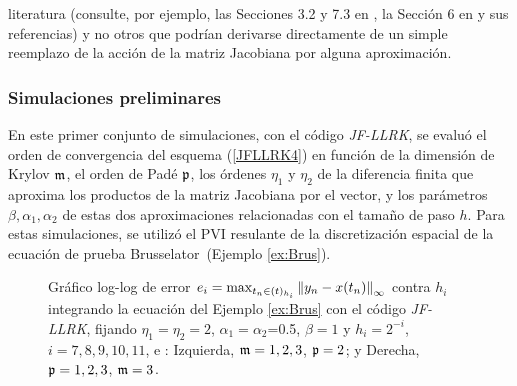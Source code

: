 literatura (consulte, por ejemplo, las Secciones 3.2 y 7.3 en \cite{hochbruck1998exponential}, la Sección 6 en \cite{einkemmer2017performance} y sus referencias) y no otros que podrían derivarse directamente de un simple reemplazo de la acción de la matriz Jacobiana por alguna aproximación.


\subsubsection{Simulaciones preliminares}
En este primer conjunto de simulaciones, con el código \textit{JF-LLRK}, se evaluó el orden de convergencia del esquema (\ref{JFLLRK4}) en función de la dimensión de Krylov $\mathfrak{m}$, el orden de Padé $\mathfrak{p}$, los órdenes $\eta_1$ y $\eta_2$ de la diferencia finita que aproxima los productos de la matriz Jacobiana por el vector, y los parámetros $\beta,\alpha_1,\alpha_2$ de estas dos aproximaciones relacionadas con el tamaño de paso $h$. Para estas simulaciones, se utilizó el PVI resulante de la discretización espacial de la ecuación de prueba  Brusselator~(Ejemplo \ref{ex:Brus}).

\begin{figure}[htb]
	\centering
	\caption{Gráfico log-log de error ${e_i=\max_{t_n\in(t)_{h_i}}\left\lVert y_n-x(t_n) \right\rVert_\infty}$ contra $h_i$ integrando la ecuación del Ejemplo \ref{ex:Brus} con el código \textit{JF-LLRK}, fijando $\eta_1=\eta_2=2$, $\alpha_1=\alpha_2$=0.5, $\beta=1$ y $h_i=2^{-i}$, $i=7,8,9,10,11$, e : Izquierda, $\mathfrak{m}=1,2,3$, $\mathfrak{p}=2$; y Derecha, $\mathfrak{p}=1,2,3$, $\mathfrak{m}=3$.} \label{Fig1}
\end{figure}

